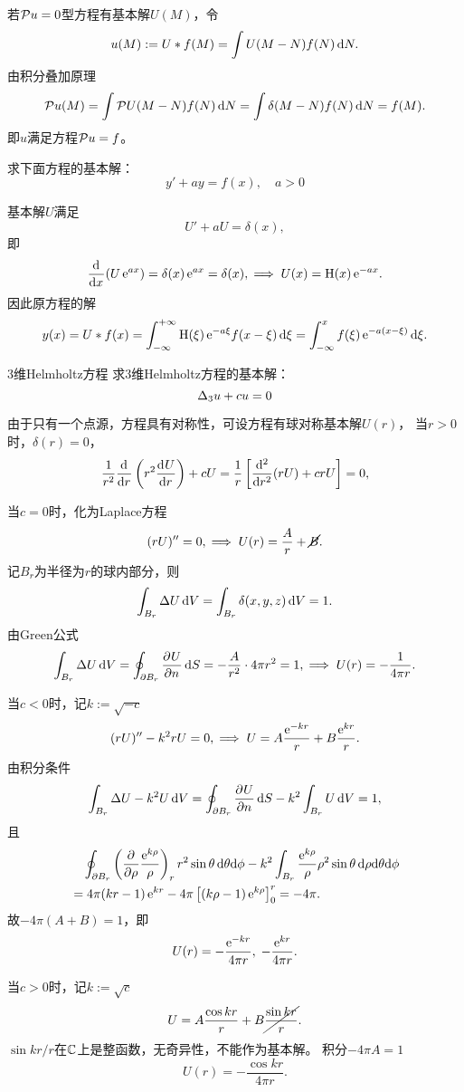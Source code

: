 若$\Par u=0$型方程有基本解$U(M)$，令
\begin{align}
	u(M):=U\ast f(M)=\int U(M-N)f(N)\d N.
\end{align}
由积分叠加原理
\[
	\Par u(M)=\int\Par U(M-N)f(N)\d N=\int\delta(M-N)f(N)\d N=f(M).
\]
即$u$满足方程$\Par u=f$。
\begin{example}{}{}
	求下面方程的基本解：
	\[
		y'+ay=f(x),\quad a>0
	\]
	
	基本解$U$满足
	\[
		U'+aU=\delta(x),
	\]
	即
	\[
		\dd x(U\e{ax})=\vd(x)\e{ax}=\delta(x),\implies U(x)=\Heaviside(x)\e{-ax}.
	\]
	因此原方程的解
	\[
		y(x)=U\ast f(x)=\int\iti\Heaviside(\xi)\e{-a\xi}f(x-\xi)\d\xi=\int_{-\infty}^xf(\xi)\e{-a(x-\xi)}\d\xi.
	\]
\end{example}
\begin{example}{3维Helmholtz方程}{}
	求3维Helmholtz方程的基本解：
	\[
		\lap_3 u+cu=0
	\]
	
	由于只有一个点源，方程具有对称性，可设方程有球对称基本解$U(r)$，
	当$r>0$时，$\delta(r)=0$，
	\[
		\frac1{r^2}\dd r\kh{r^2\dv Ur}+cU=\frac1r\fkh{\dd[2]r(rU)+crU}=0,
	\]
	
	当$c=0$时，化为Laplace方程
	\[
		(rU)''=0,\implies U(r)=\frac Ar+\cancel{B}.
	\]
	记$B_r$为半径为$r$的球内部分，则
	\[
		\int_{B_r}\lap U\d V=\int_{B_r}\delta(x,y,z)\d V=1.
	\]
	由Green公式
	\[
		\int_{B_r}\lap U\d V=\oint_{\p B_r}\pv Un\d S=-\frac A{r^2}\cdot 4\pi r^2=1,\implies U(r)=-\frac1{4\pi r}.
	\]
	
	当$c<0$时，记$k:=\sqrt{-c}$
	\[
		(rU)''-k^2rU=0,\implies U=A\frac{\e{-kr}}r+B\frac{\e{kr}}r.
	\]
	由积分条件
	\[
		\int_{B_r}\lap U-k^2U\d V=\oint_{\p B_r}\pv Un\d S-k^2\int_{B_r}U\d V=1,
	\]
	且
	\begin{align*}
		&\quad\oint_{\p B_r}\kh{\pp\rho\frac{\e{k\rho}}\rho}_rr^2\sin\theta\d\theta\nd\phi-k^2\int_{B_r}\frac{\e{k\rho}}\rho\rho^2\sin\theta\d\rho\nd\theta\nd\phi\\
		&=4\pi(kr-1)\e{kr}-4\pi\fkh{(k\rho-1)\e{k\rho}}_0^r=-4\pi.
	\end{align*}
	故$-4\pi(A+B)=1$，即
	\[
		U(r)=-\frac{\e{-kr}}{4\pi r},\;-\frac{\e{kr}}{4\pi r}.
	\]
	
	当$c>0$时，记$k:=\sqrt c$
	\[
		U=A\frac{\cos kr}r+B\cancel{\frac{\sin kr}r}.
	\]
	$\sin kr/r$在$\CC$上是整函数，无奇异性，不能作为基本解。
	积分$-4\pi A=1$
	\[
		U(r)=-\frac{\cos kr}{4\pi r}.
	\]
\end{example}
